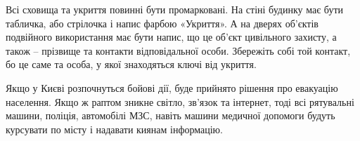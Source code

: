 
Всі сховища та укриття повинні бути промарковані. На стіні будинку має бути
табличка, або стрілочка і напис фарбою «Укриття». А на дверях об’єктів
подвійного використання має бути напис, що це об’єкт цивільного захисту, а
також – прізвище та контакти відповідальної особи. Збережіть собі той контакт,
бо це саме та особа, у якої знаходяться ключі від укриття.

Якщо у Києві розпочнуться бойові дії, буде прийнято рішення про евакуацію
населення. Якщо ж раптом зникне світло, зв’язок та інтернет, тоді всі
рятувальні машини, поліція, автомобілі МЗС, навіть машини медичної допомоги
будуть курсувати по місту і надавати киянам інформацію.
